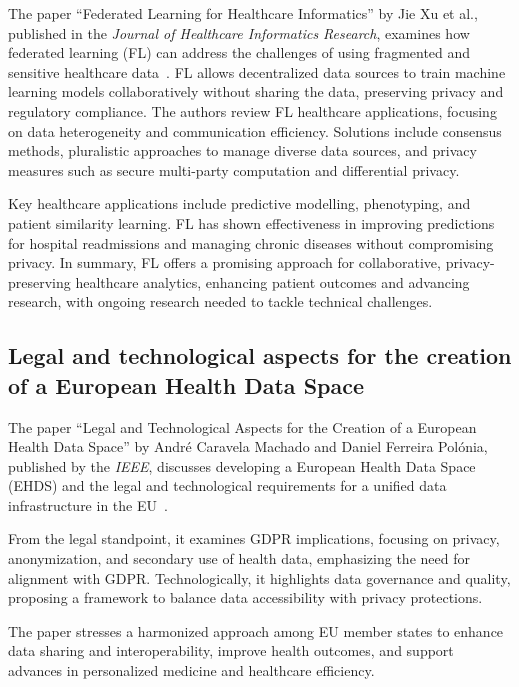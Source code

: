 The paper ``Federated Learning for Healthcare Informatics'' by Jie Xu et al., published in the \textit{Journal of Healthcare Informatics Research}, examines how federated learning (FL) can address the challenges of using fragmented and sensitive healthcare data~\cite{federated_learning_for_healthcare_infromatics}.
FL allows decentralized data sources to train machine learning models collaboratively without sharing the data, preserving privacy and regulatory compliance.
The authors review FL healthcare applications, focusing on data heterogeneity and communication efficiency.
Solutions include consensus methods, pluralistic approaches to manage diverse data sources, and privacy measures such as secure multi-party computation and differential privacy.

Key healthcare applications include predictive modelling, phenotyping, and patient similarity learning.
FL has shown effectiveness in improving predictions for hospital readmissions and managing chronic diseases without compromising privacy.
In summary, FL offers a promising approach for collaborative, privacy-preserving healthcare analytics, enhancing patient outcomes and advancing research, with ongoing research needed to tackle technical challenges.

\subsection{Legal and technological aspects for the creation of a European Health Data Space}\label{subsec:legal-and-technological-aspects-for-the-creation-of-a-european-health-data-space}

The paper ``Legal and Technological Aspects for the Creation of a European Health Data Space'' by André Caravela Machado and Daniel Ferreira Polónia, published by the \textit{IEEE}, discusses developing a European Health Data Space (EHDS) and the legal and technological requirements for a unified data infrastructure in the EU~\cite{legal_and_technological_aspects_of_ehds}.

From the legal standpoint, it examines GDPR implications, focusing on privacy, anonymization, and secondary use of health data, emphasizing the need for alignment with GDPR. Technologically, it highlights data governance and quality, proposing a framework to balance data accessibility with privacy protections.

The paper stresses a harmonized approach among EU member states to enhance data sharing and interoperability, improve health outcomes, and support advances in personalized medicine and healthcare efficiency.

